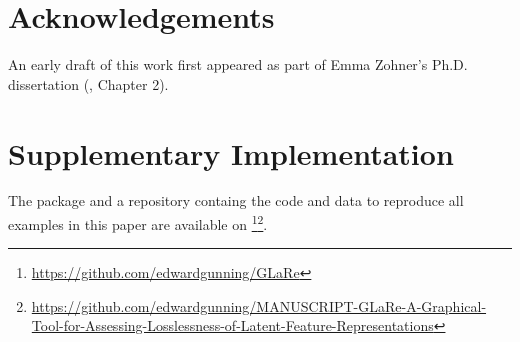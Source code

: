 \section*{Acknowledgements}
An early draft of this work first appeared as part of Emma Zohner's Ph.D. dissertation (\citeyear{zohner_feature_2021}, Chapter 2).

\section*{Supplementary Implementation}

The   package and a repository containg the code and data to reproduce all examples in this paper are available on \footnote{\url{https://github.com/edwardgunning/GLaRe}}\footnote{\url{https://github.com/edwardgunning/MANUSCRIPT-GLaRe-A-Graphical-Tool-for-Assessing-Losslessness-of-Latent-Feature-Representations}}.